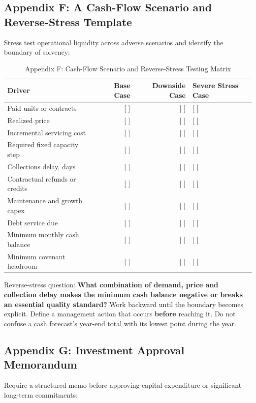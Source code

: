 \subsection{Appendix F: A Cash-Flow Scenario and Reverse-Stress Template}

Stress test operational liquidity across adverse scenarios and identify the boundary of solvency:

\begin{table}[t]
\centering
\small
\caption{Appendix F: Cash-Flow Scenario and Reverse-Stress Testing Matrix}
\label{tab:app_f_stress}
\begin{tabularx}{\textwidth}{p{4.8cm} r r X}
\toprule
\textbf{Driver} & \textbf{Base Case} & \textbf{Downside Case} & \textbf{Severe Stress Case} \\
\midrule
Paid units or contracts & [ ] & [ ] & [ ] \\
Realized price & [ ] & [ ] & [ ] \\
Incremental servicing cost & [ ] & [ ] & [ ] \\
Required fixed capacity step & [ ] & [ ] & [ ] \\
Collections delay, days & [ ] & [ ] & [ ] \\
Contractual refunds or credits & [ ] & [ ] & [ ] \\
Maintenance and growth capex & [ ] & [ ] & [ ] \\
Debt service due & [ ] & [ ] & [ ] \\
Minimum monthly cash balance & [ ] & [ ] & [ ] \\
Minimum covenant headroom & [ ] & [ ] & [ ] \\
\bottomrule
\end{tabularx}
\end{table}

Reverse-stress question: \textbf{What combination of demand, price and collection delay makes the minimum cash balance negative or breaks an essential quality standard?} Work backward until the boundary becomes explicit. Define a management action that occurs \textbf{before} reaching it. Do not confuse a cash forecast's year-end total with its lowest point during the year.

\subsection{Appendix G: Investment Approval Memorandum}

Require a structured memo before approving capital expenditure or significant long-term commitments:

